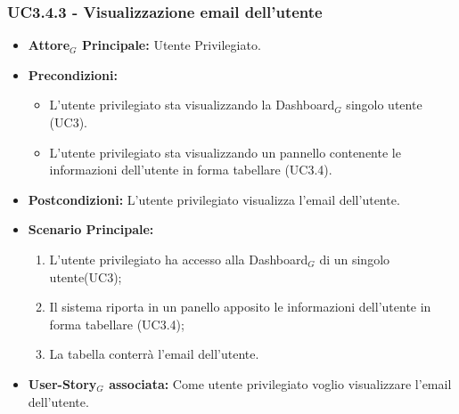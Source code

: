 \documentclass[11pt]{article}
\begin{document}
\begin{justify}
\subsubsection{\textbf{UC3.4.3 - Visualizzazione email dell'utente}}
\label{UC3.4.3}
\begin{itemize}
     \item \textbf{Attore$_G$ Principale:} Utente Privilegiato.
     \item \textbf{Precondizioni:}
        \begin{itemize}
    	\item L'utente privilegiato sta visualizzando la Dashboard$_G$ singolo utente (UC3).
          \item L'utente privilegiato sta visualizzando un pannello contenente le informazioni dell'utente in forma tabellare (UC3.4).
        \end{itemize}
      \item \textbf{Postcondizioni:} L'utente privilegiato visualizza l'email dell'utente.
      \item \textbf{Scenario Principale:}
        \begin{enumerate}
            \item L'utente privilegiato ha accesso alla Dashboard$_G$ di un singolo utente(UC3);
            \item Il sistema riporta  in un panello apposito le informazioni dell'utente in forma tabellare (UC3.4);
            \item La tabella conterrà l'email dell'utente.
        \end{enumerate}
     \item \textbf{User-Story$_G$ associata:}
       Come utente privilegiato voglio visualizzare l'email dell'utente.
\end{itemize}


\end{justify}
\end{document}
